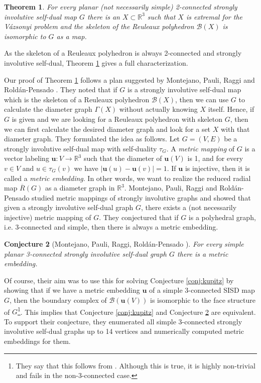 \documentclass{article}
\newtheorem{theorem}{Theorem}[section]
\newtheorem{conjecture}[theorem]{Conjecture}
\newcommand{\vu}[0]{\mathbf{u}}
\newcommand{\R}[0]{\mathbb{R}}
\newcommand{\Bc}[0]{\mathcal{B}}
\begin{document}
\begin{theorem}\label{thm:main_skeleton}
For every planar (not necessarily simple) 2-connected strongly involutive self-dual map $G$ there is an $X\subset \R^3$ such that $X$ is extremal for the Vázsonyi problem and the skeleton of the Reuleaux polyhedron $\Bc(X)$  is isomorphic to $G$ as a map. 
\end{theorem}


As the skeleton of a Reuleaux polyhedron is always 2-connected and strongly involutive self-dual, Theorem \ref{thm:main_skeleton} gives a full characterization. 

Our proof of Theorem \ref{thm:main_skeleton}  follows a plan suggested by Montejano, Pauli, Raggi and  Roldán-Pensado \cite{montejano2020graphs}. They noted that if $G$ is a strongly involutive self-dual map which is the skeleton of a Reuleaux polyhedron $\Bc(X)$, then we can use $G$ to calculate the diameter graph $\Gamma(X)$ without actually knowing $X$ itself. Hence, if $G$ is given and we are looking for a Reuleaux polyhedron with skeleton $G$, then we can first calculate the desired diameter graph and look for a set $X$ with that diameter graph. They formulated the idea as follows. Let $G=(V,E)$ be a strongly involutive self-dual map with self-duality $\tau_G$.  A \emph{metric mapping} of $G$ is a vector labeling $\vu : V \rightarrow \mathbb{R}^3$ such that the diameter of $\vu(V)$ is 1, and for every $v \in V$ and $u \in \tau_G(v)$ we have $|\vu(u)- \vu(v)| = 1$. If $\vu$ is injective, then it is called a \emph{metric embedding}. In other words, we want to realize the reduced radial map $\overline R(G)$ as a diameter graph in $\R^3$. Montejano, Pauli, Raggi and  Roldán-Pensado studied metric mappings of strongly involutive graphs \cite{montejano2020graphs} and showed that given a strongly involutive self-dual graph $G$, there exists a (not necessarily injective) metric mapping of $G$.  
They conjectured that if $G$ is a polyhedral graph, i.e. 3-connected and simple, then there is always a metric embedding. 

\begin{conjecture}[Montejano, Pauli, Raggi, Roldán-Pensado \cite{montejano2020graphs}]\label{conj:montereuleaux}
 For every simple planar 3-connected strongly involutive self-dual graph $G$ there is a metric embedding.
\end{conjecture}

Of course, their aim was to use this for solving Conjecture \ref{conj:kupitz} by showing that if we have a metric embedding $\vu$ of a simple 3-connected SISD map $G$, then the boundary complex of  $\Bc(\vu(V))$ is isomorphic to the face structure of $G$\footnote{They say that this follows from \cite{kupitz2010ball}. Although this is true, it is highly non-trivial and fails in the non-3-connected case. }. This implies that Conjecture \ref{conj:kupitz} and Conjecture \ref{conj:montereuleaux} are equivalent. To support their conjecture, they enumerated all simple 3-connected strongly involutive self-dual graphs up to 14 vertices and numerically computed metric embeddings for them.
\end{document}
